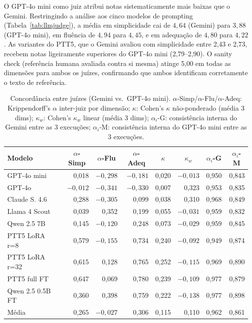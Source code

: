 \documentclass[a4paper, twocolumn, 11pt, twoside]{article}
\begin{document}
O GPT-4o mini como juiz atribui notas sistematicamente mais baixas que
o Gemini. Restringindo a análise aos cinco modelos de prompting
(Tabela~\ref{tab:llmjudge}), a média em simplicidade cai de
$4{,}64$ (Gemini) para $3{,}88$ (GPT-4o mini), em fluência de
$4{,}94$ para $4{,}45$, e em adequação de $4{,}80$ para
$4{,}22$. As
variantes do PTT5, que o Gemini avaliou com simplicidade entre 2,43 e
2,73, recebem notas ligeiramente superiores do GPT-4o mini
(2,79--2,90). O sanity check (referência humana avaliada contra si
mesma) atinge 5,00 em todas as dimensões para ambos os juízes,
confirmando que ambos identificam corretamente o texto de referência.

\begin{table}[htbp]
\centering
\caption{Concordância entre juízes (Gemini vs.\ GPT-4o mini).
         $\alpha$-Simp/$\alpha$-Flu/$\alpha$-Adeq: Krippendorff's $\alpha$
         inter-juiz por dimensão; $\kappa$: Cohen's $\kappa$ não-ponderado
         (média 3 dims); $\kappa_w$: Cohen's $\kappa_w$ linear
         (média 3 dims); $\alpha_{i}$-G: consistência interna do Gemini
         entre as 3 execuções; $\alpha_{i}$-M: consistência interna do
         GPT-4o mini entre as 3 execuções.}
\label{tab:agreement}
\footnotesize
\setlength{\tabcolsep}{3pt}
\begin{tabular}{l r r r r r r r}
\toprule
Modelo & \multicolumn{1}{c}{$\alpha$-Simp}
       & \multicolumn{1}{c}{$\alpha$-Flu}
       & \multicolumn{1}{c}{$\alpha$-Adeq}
       & \multicolumn{1}{c}{$\kappa$}
       & \multicolumn{1}{c}{$\kappa_w$}
       & \multicolumn{1}{c}{$\alpha_{i}$-G}
       & \multicolumn{1}{c}{$\alpha_{i}$-M} \\
\midrule
GPT-4o mini          &  0,018 & $-0,298$ & $-0,181$ &  0,020  & $-0,013$ & 0,950  & 0,843  \\
GPT-4o               & $-0,012$ & $-0,341$ & $-0,330$ &  0,007  &  0,323  & 0,953  & 0,835  \\
Claude S. 4.6        &  0,288 & $-0,305$ &  0,099  &  0,038  &  0,310  & 0,968  & 0,849  \\
Llama 4 Scout        &  0,039 &  0,352  &  0,199  &  0,055  & $-0,031$ & 0,959  & 0,832  \\
Qwen 2.5 7B          &  0,145 & $-0,120$ &  0,248  &  0,073  & $-0,029$ & 0,959  & 0,845  \\
PTT5 LoRA r=8        &  0,579 & $-0,155$ &  0,734  &  0,240  & $-0,092$ & 0,949  & 0,874  \\
PTT5 LoRA r=32       &  0,615 &  0,128  &  0,765  &  0,252  & $-0,115$ & 0,969  & 0,890  \\
PTT5 full FT         &  0,647 &  0,069  &  0,780  &  0,239  & $-0,109$ & 0,977  & 0,879  \\
Qwen 2.5 0.5B FT     &  0,360 &  0,398  &  0,759  &  0,222  & $-0,138$ & 0,977  & 0,898  \\
\midrule
Média                &  0,265 & $-0,027$ &  0,306  &  0,115  &  0,110  & 0,962  & 0,861  \\
\bottomrule
\end{tabular}
\end{table}
\end{document}
